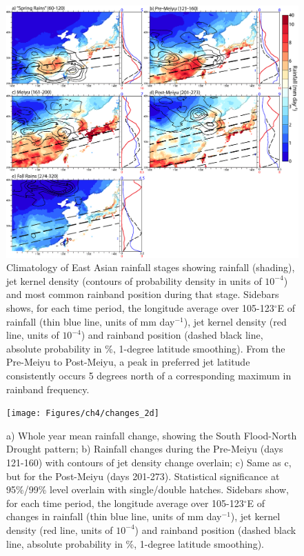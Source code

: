\begin{figure}
\noindent\includegraphics[width=36pc]{Figures/ch4/climo}
\caption{Climatology of East Asian rainfall stages showing rainfall (shading), jet kernel density (contours of probability density in units of $10^{-4}$) and most common rainband position during that stage. Sidebars shows, for each time period, the longitude average over 105-123$^{\circ}$E of rainfall (thin blue line, units of mm day$^{-1}$), jet kernel density (red line, units of $10^{-4}$) and rainband position (dashed black line, absolute probability in \%, 1-degree latitude smoothing). From the Pre-Meiyu to Post-Meiyu, a peak in preferred jet latitude consistently occurs 5 degrees north of a corresponding maximum in rainband frequency.}
\label{fig:climo}
\end{figure}


\begin{figure}
\noindent\texttt{[image: Figures/ch4/changes\_2d]}
\caption{a) Whole year mean rainfall change, showing the South Flood-North Drought pattern; b) Rainfall changes during the Pre-Meiyu (days 121-160) with contours of jet density change overlain; c) Same as c, but for the Post-Meiyu (days 201-273). Statistical significance at 95\%/99\% level overlain with single/double hatches. Sidebars show, for each time period, the longitude average over 105-123$^{\circ}$E of changes in rainfall (thin blue line, units of mm day$^{-1}$), jet kernel density (red line, units of $10^{-4}$) and rainband position (dashed black line, absolute probability in \%, 1-degree latitude smoothing).}
\label{fig:changes_2d}
\end{figure}

